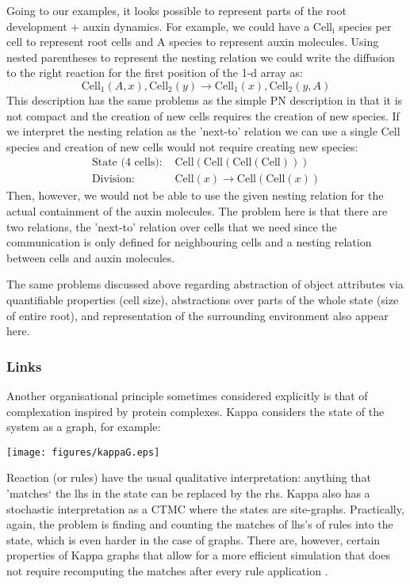 Going to our examples, it looks possible to represent parts of the root
development + auxin dynamics. For example, we could have a $\mathrm{Cell_i}$
species per cell to represent root cells and $\mathrm{A}$ species to represent auxin
molecules. Using nested parentheses to represent the nesting relation we could
write the diffusion to the right reaction for the first position of the 1-d
array as:
$$
\mathrm{Cell_1}(A, x), \mathrm{Cell_2}(y) \rightarrow \mathrm{Cell_1}(x), \mathrm{Cell_2}(y, A)
$$
This description has the same problems as the simple PN description in that it is
not compact and the creation of new cells requires the creation of new
species. If we interpret the nesting relation as the 'next-to' relation we
can use a single $\mathrm{Cell}$ species and creation of new cells would not
require creating new species:
\begin{align*}
  \text{State (4 cells): } & \mathrm{Cell(Cell(Cell(Cell)))} \\
  \text{Division: } & \mathrm{Cell}(x) \rightarrow \mathrm{Cell}(\mathrm{Cell}(x))
\end{align*}
Then, however, we would not be able to use the given nesting relation for the
actual containment of the auxin molecules. The problem here is that there are
two relations, the 'next-to' relation over cells that we need since the
communication is only defined for neighbouring cells and a nesting relation
between cells and auxin molecules.

The same problems discussed above regarding abstraction of object attributes via
quantifiable properties (\eg cell size), abstractions over parts of the whole
state (\eg size of entire root), and representation of the surrounding
environment also appear here.

\subsubsection*{Links}
\label{subsec:links}
Another organisational principle sometimes considered explicitly is that of
complexation inspired by protein complexes. Kappa \citep{danos_formal_2004}
considers the state of the system as a graph, for example:
\begin{center}
    \texttt{[image: figures/kappaG.eps]}
  \end{center}
Reaction (or rules) have the usual qualitative interpretation: anything that
'matches` the lhs in the state can be replaced by the rhs. Kappa
also has a stochastic interpretation as a CTMC where the states are
site-graphs. Practically, again, the problem is finding and counting the matches
of lhs's of rules into the state, which is even harder in the case of
graphs. There are, however, certain properties of Kappa graphs that
allow for a more efficient simulation that does not require recomputing the
matches after every rule application \citep{danos_scalable_2007}.
  
